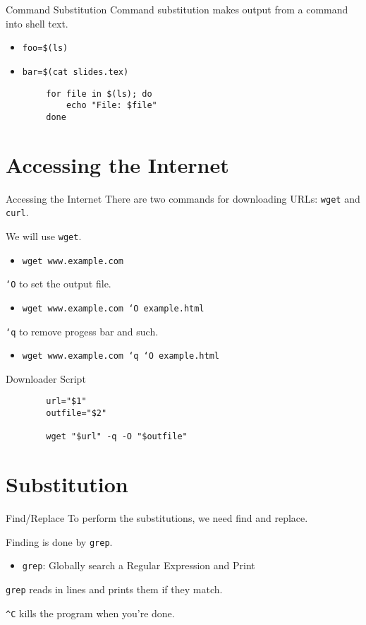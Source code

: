\documentclass[pdf,usenames,dvipsnames,14pt]{beamer}%
\newcommand\hyphen{\char`\-}
\newcommand\textasciicaret{\textasciicircum}
\begin{document}
\begin{frame}[fragile]{Command Substitution}
	Command substitution makes output from a command into shell text.
	\begin{itemize}
		\item \texttt{foo=\$(ls)}
		\item \texttt{bar=\$(cat slides.tex)}
	\end{itemize}
	\begin{verbatim}
		for file in $(ls); do
		    echo "File: $file"
		done
	\end{verbatim}
\end{frame}

\section{Accessing the Internet}

\begin{frame}{Accessing the Internet}
	There are two commands for downloading URLs: \texttt{wget} and \texttt{curl}.
	
	We will use \texttt{wget}.
	\begin{itemize}
		\item \texttt{wget www.example.com}
	\end{itemize}
	\texttt{\hyphen O} to set the output file.
	\begin{itemize}
		\item \texttt{wget www.example.com \hyphen O example.html}
	\end{itemize}
	\texttt{\hyphen q} to remove progess bar and such.
	\begin{itemize}
		\item \texttt{wget www.example.com \hyphen q \hyphen O example.html}
	\end{itemize}
\end{frame}

\begin{frame}[fragile]{Downloader Script}
	\begin{verbatim}
		url="$1"
		outfile="$2"
		
		wget "$url" -q -O "$outfile"
	\end{verbatim}
\end{frame}

\section{Substitution}

\begin{frame}{Find/Replace}
	To perform the substitutions, we need find and replace.
	
	Finding is done by \texttt{grep}.
	\begin{itemize}
		\item \texttt{grep}: Globally search a Regular Expression and Print
	\end{itemize}
	\texttt{grep} reads in lines and prints them if they match.
	
	\texttt{\textasciicaret C} kills the program when you're done.
\end{frame}
\end{document}
